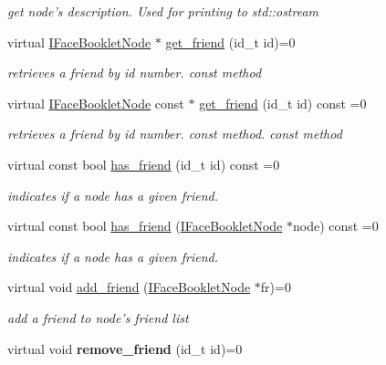 \begin{DoxyCompactItemize}
\begin{DoxyCompactList}\small\item\em get node's description.  Used for printing to std\+::ostream \end{DoxyCompactList}\item 
virtual \hyperlink{structfb_1_1_i_face_booklet_node}{I\+Face\+Booklet\+Node} $\ast$ \hyperlink{structfb_1_1_i_face_booklet_node_ae78da353e70e25f3fac8976618bfcde8}{get\+\_\+friend} (id\+\_\+t id)=0
\begin{DoxyCompactList}\small\item\em retrieves a friend by id number.  const method \end{DoxyCompactList}\item 
virtual \hyperlink{structfb_1_1_i_face_booklet_node}{I\+Face\+Booklet\+Node} const $\ast$ \hyperlink{structfb_1_1_i_face_booklet_node_a3a1b982ac4239e23c2204c7746dc90f0}{get\+\_\+friend} (id\+\_\+t id) const =0
\begin{DoxyCompactList}\small\item\em retrieves a friend by id number. const method.  const method \end{DoxyCompactList}\item 
virtual const bool \hyperlink{structfb_1_1_i_face_booklet_node_a2692d3ad9e903bd545c7074c710e5cdc}{has\+\_\+friend} (id\+\_\+t id) const =0
\begin{DoxyCompactList}\small\item\em indicates if a node has a given friend. \end{DoxyCompactList}\item 
virtual const bool \hyperlink{structfb_1_1_i_face_booklet_node_af821de82c96e235108ca909a92838dc1}{has\+\_\+friend} (\hyperlink{structfb_1_1_i_face_booklet_node}{I\+Face\+Booklet\+Node} $\ast$node) const =0
\begin{DoxyCompactList}\small\item\em indicates if a node has a given friend. \end{DoxyCompactList}\item 
\hypertarget{structfb_1_1_i_face_booklet_node_a1add30a9097411c481cf0fe2cf69f648}{virtual void \hyperlink{structfb_1_1_i_face_booklet_node_a1add30a9097411c481cf0fe2cf69f648}{add\+\_\+friend} (\hyperlink{structfb_1_1_i_face_booklet_node}{I\+Face\+Booklet\+Node} $\ast$fr)=0}\label{structfb_1_1_i_face_booklet_node_a1add30a9097411c481cf0fe2cf69f648}

\begin{DoxyCompactList}\small\item\em add a friend to node's friend list \end{DoxyCompactList}\item 
\hypertarget{structfb_1_1_i_face_booklet_node_a7cc6a24cc5863b5d095369faa2066042}{virtual void {\bfseries remove\+\_\+friend} (id\+\_\+t id)=0}\label{structfb_1_1_i_face_booklet_node_a7cc6a24cc5863b5d095369faa2066042}

\end{DoxyCompactItemize}
